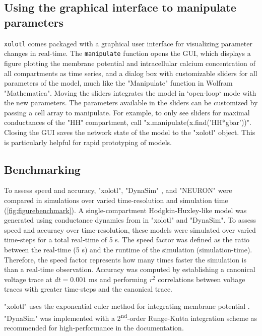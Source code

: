 \documentclass{frontiersSCNS} %
\begin{document}
\subsection{Using the graphical interface to manipulate parameters}

\texttt{xolotl} comes packaged with a graphical user interface for visualizing parameter changes in real-time. The \texttt{manipulate} function opens the GUI, which displays a figure plotting the membrane potential and intracellular calcium concentration of all compartments as time series, and a dialog box with customizable sliders for all parameters of the model, much like the "Manipulate" function in Wolfram "Mathematica". Moving the sliders integrates the model in `open-loop` mode with the new parameters. The parameters available in the sliders can be customized by passing a cell array to manipulate. For example, to only see sliders for maximal conductances of the "HH" compartment, call "x.manipulate(x.find('HH*gbar'))". Closing the GUI saves the network state of the model to the "xolotl" object. This is particularly helpful for rapid prototyping of models.

\subsection{Benchmarking}

To assess speed and accuracy, "xolotl", "DynaSim" \autocite{sherfeyDynaSimMATLABToolbox2018}, and "NEURON" \autocite{hinesNEURONSimulationEnvironment1997} were compared in simulations over varied time-resolution and simulation time (\ref{fig:figurebenchmark}). A single-compartment Hodgkin-Huxley-like model was generated using conductance dynamics from \cite{liuModelNeuronActivitydependent1998} in "xolotl" and "DynaSim". To assess speed and accuracy over time-resolution, these models were simulated over varied time-steps for a total real-time of 5 s. The speed factor was defined as the ratio between the real-time (5 s) and the runtime of the simulation (simulation-time). Therefore, the speed factor represents how many times faster the simulation is than a real-time observation. Accuracy was computed by establishing a canonical voltage trace at $dt = 0.001$ ms and performing $r^2$ correlations between voltage traces with greater time-steps and the canonical trace.

"xolotl" uses the exponential euler method for integrating membrane potential \autocite{dayanTheoreticalNeuroscience2001}. "DynaSim" was implemented with a 2\textsuperscript{nd}-order Runge-Kutta integration scheme as recommended for high-performance in the documentation.
\end{document}

